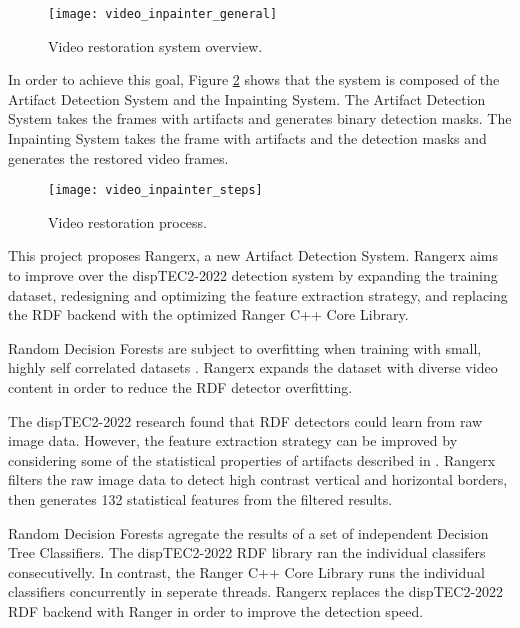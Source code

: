 \begin{figure} [!h]
  \centering
  
  \texttt{[image: video\_inpainter\_general]}
  
  \caption{Video restoration system overview.}
  \label{fig:restoration_system_overview}

\end{figure}

In order to achieve this goal, Figure \ref{fig:restoration_system_steps} shows that the system is composed of the Artifact Detection System and the Inpainting System. The Artifact Detection System takes the frames with artifacts and generates binary detection masks. The Inpainting System takes the frame with artifacts and the detection masks and generates the restored video frames.

\begin{figure} [!h]
  \centering
  
  \texttt{[image: video\_inpainter\_steps]}
  
  \caption{Video restoration process. }
  \label{fig:restoration_system_steps}

\end{figure}

This project proposes Rangerx, a new Artifact Detection System. Rangerx aims to improve over the dispTEC2-2022 detection system by expanding the training dataset, redesigning and optimizing the feature extraction strategy, and replacing the RDF backend with the optimized Ranger C++ Core Library.

Random Decision Forests are subject to overfitting when training with small, highly self correlated datasets \cite{Breiman2001}. Rangerx expands the dataset with diverse video content in order to reduce the RDF detector overfitting.

The dispTEC2-2022 research found that RDF detectors could learn from raw image data. However, the feature extraction strategy can be improved by considering some of the statistical properties of artifacts described in \cite{Vranjes2019, Glavota2018}. Rangerx filters the raw image data to detect high contrast vertical and horizontal borders, then generates 132 statistical features from the filtered results.

Random Decision Forests agregate the results of a set of independent Decision Tree Classifiers. The dispTEC2-2022 RDF library ran the individual classifers consecutivelly. In contrast, the Ranger C++ Core Library runs the individual classifiers concurrently in seperate threads. Rangerx replaces the dispTEC2-2022 RDF backend with Ranger in order to improve the detection speed.

